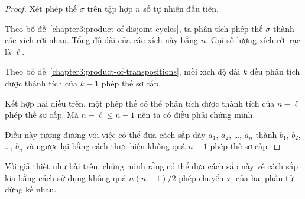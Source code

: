 \documentclass[class=linearalgebra,crop=false]{standalone}
\begin{document}
\begin{proof}
    \par Xét phép thế $\sigma$ trên tập hợp $n$ số tự nhiên đầu tiên.
    \par Theo bổ đề~\ref{chapter3:product-of-disjoint-cycles}, ta phân tích phép thế $\sigma$ thành các xích rời nhau. Tổng độ dài của các xích này bằng $n$. Gọi số lượng xích rời rạc là $\ell$.
    \par Theo bổ đề~\ref{chapter3:product-of-transpositions}, mỗi xích độ dài $k$ đều phân tích được thành tích của $k-1$ phép thế sơ cấp.
    \par Kết hợp hai điều trên, một phép thế có thể phân tích được thành tích của $n - \ell$ phép thế sơ cấp. Mà $n - \ell \le n - 1$ nên ta có điều phải chứng minh.
    \par Điều này tương đương với việc có thể đưa cách sắp dãy $a_{1}$, $a_{2}$, \ldots, $a_{n}$ thành $b_{1}$, $b_{2}$, \ldots, $b_{n}$ và ngược lại bằng cách thực hiện không quá $n - 1$ phép thế sơ cấp.
\end{proof}

\begin{exercise}
    Với giả thiết như bài trên, chứng minh rằng có thể đưa cách sắp này về cách sắp kia bằng cách sử dụng không quá $n(n-1)/2$ phép chuyển vị của hai phần tử đứng kề nhau.
\end{exercise}
\end{document}
